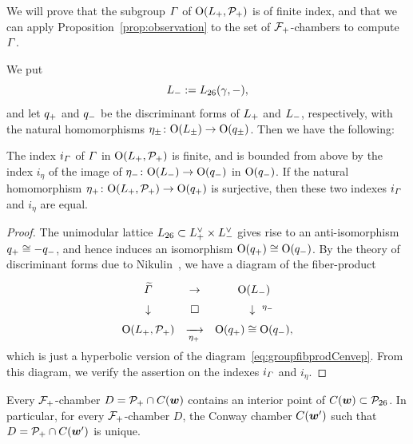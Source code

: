 \documentclass{amsart} %
\begin{document}
We will prove  that 
the  subgroup $\varGamma$ of $ \mathord{\mathrm{O}}(L_{+}, \mathord{\mathcal{P}}_{+})$ is of finite index,
and that we can apply
Proposition~\ref{prop:observation}
to the set of $\mathord{\mathcal{F}}_{+}$-chambers
to compute $\varGamma$.
%
\par
We put 
\[
L_{-}:=L_{26}(\gamma, -),
\]
and let $q_{+}$ and $q_{-}$ be the discriminant forms 
of $L_{+}$ and $L_{-}$, respectively,
with the natural homomorphisms $\eta_{\pm}\colon \mathord{\mathrm{O}}(L_{\pm})\to \mathord{\mathrm{O}}(q_{\pm})$.
Then we have the following:
%
\begin{proposition}\label{prop:vGamindex}
The index $i_{\varGamma}$   of $\varGamma$ in  $ \mathord{\mathrm{O}}(L_{+}, \mathord{\mathcal{P}}_{+})$
is finite, and is bounded from above by  the index  $i_{\eta}$ of the image 
of ${\eta}_{-}\colon  \mathord{\mathrm{O}}(L_{-})  \to \mathord{\mathrm{O}}(q_{-})$ 
in $\mathord{\mathrm{O}}(q_{-})$.
If the natural homomorphism ${\eta}_{+}\colon \mathord{\mathrm{O}}(L_{+}, \mathord{\mathcal{P}}_{+})  \to  \mathord{\mathrm{O}}(q_{+})$ is surjective, 
then these two indexes $i_{\varGamma}$ and $i_{\eta}$ are equal.
\end{proposition}
%
\begin{proof}
The unimodular lattice  $L_{26}\subset L_{+}^{\vee}\times L_{-}^{\vee}$ 
gives rise to  an anti-isomorphism $q_{+}\cong -q_{-}$, 
and hence induces an isomorphism
$\mathord{\mathrm{O}}(q_{+})\cong \mathord{\mathrm{O}}(q_{-})$.
By the theory of discriminant forms due to Nikulin~\cite{MR525944}, 
we have a diagram of the fiber-product
%
\begin{equation}\label{eq:groupfibprodP}
\renewcommand{\arraystretch}{1.5}
\begin{array}{ccc}
\tilvGam &\to  & \OG(\Lminus) \\
\downarrow & \square& \downarrow\rlap{ ${}^{\etaminus}$} \\
\OG(\Lplus, \PPPplus) & \maprightsb{\etaplus} & \OG(\qplus)\cong \OG(\qminus), 
\end{array}
\end{equation}
% 
which  is just 
a  hyperbolic version of the diagram~\eqref{eq:groupfibprodCenvep}.
From this diagram, we verify the assertion on  the indexes $i_{\varGamma}$ and $i_{\eta}$.
\end{proof}
%
%
%
%
%
\begin{proposition}\label{prop:interior}
Every $\mathord{\mathcal{F}}_{+}$-chamber $D=\mathord{\mathcal{P}}_{+} \cap \mathord{C}(\boldsymbol{w})$
contains an interior point of   $ \mathord{C}(\boldsymbol{w}) \subset \mathord{\mathcal{P}}_{26}$.
In particular, for every $\mathord{\mathcal{F}}_{+}$-chamber $D$,
the Conway chamber $ \mathord{C}(\boldsymbol{w}^{\prime}) $
such that $D=\mathord{\mathcal{P}}_{+} \cap \mathord{C}(\boldsymbol{w}^{\prime})$ is unique.
\end{proposition}
\end{document}
